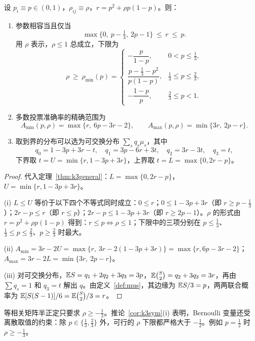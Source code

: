 \documentclass[11pt]{article}
\begin{document}
\begin{corollary}[对称情形]\label{cor:k3sym}
设 $p_i\equiv p\in(0,1)$，$\rho_{ij}\equiv\rho$，$r=p^2+\rho p(1-p)$。则：
\begin{enumerate}[label=(\roman*)]
\item 参数相容当且仅当
\begin{equation}\label{eq:feas}
\max\{0,\ p-\tfrac13,\ 2p-1\}\ \le\ r\ \le\ p .
\end{equation}
用 $\rho$ 表示，$\rho\le1$ 总成立，下限为
\[
\rho\ \ge\ \rho_{\min}(p)=\begin{cases}-\dfrac{p}{1-p}, & 0<p\le\frac13,\\[2mm] \dfrac{p-\frac13-p^2}{p(1-p)}, & \frac13\le p\le\frac23,\\[2mm] -\dfrac{1-p}{p}, & \frac23\le p<1 .\end{cases}
\]
\item 多数投票准确率的精确范围为
\[
\boxed{\ A_{\min}(p,\rho)=\max\{r,\ 6p-3r-2\},\qquad A_{\max}(p,\rho)=\min\{3r,\ 2p-r\}.\ }
\]
\item 取到界的分布可以选为可交换分布 $\sum_s q_s\mu_s$，其中
\[
q_0=1-3p+3r-t,\quad q_1=3p-6r+3t,\quad q_2=3r-3t,\quad q_3=t,
\]
下界取 $t=U=\min\{r,1-3p+3r\}$，上界取 $t=L=\max\{0,2r-p\}$。
\end{enumerate}
\end{corollary}
\begin{proof}
代入定理~\ref{thm:k3general}：$L=\max\{0,2r-p\}$，$U=\min\{r,1-3p+3r\}$。

(i) $L\le U$ 等价于以下四个不等式同时成立：$0\le r$；$0\le1-3p+3r$（即 $r\ge p-\frac13$）；$2r-p\le r$（即 $r\le p$）；$2r-p\le1-3p+3r$（即 $r\ge2p-1$）。$\rho$ 的形式由 $r=p^2+\rho p(1-p)$ 得到：$r\le p\iff\rho\le1$；下限中的三项分别在 $p\le\frac13$、$\frac13\le p\le\frac23$、$p\ge\frac23$ 时最大。

(ii) $A_{\min}=3r-2U=\max\{r,\ 3r-2(1-3p+3r)\}=\max\{r,6p-3r-2\}$；$A_{\max}=3r-2L=\min\{3r,\ 2p-r\}$。

(iii) 对可交换分布，$\mathbb{E} S=q_1+2q_2+3q_3=3p$，$\mathbb{E}\binom S2=q_2+3q_3=3r$，再由 $\sum q_s=1$ 和 $q_3=t$ 解出 $q$。由定义~\ref{def:mus}，其边缘为 $\mathbb{E} S/3=p$，两两联合概率为 $\mathbb{E}[S(S-1)]/6=\mathbb{E}\binom S2/3=r$。
\end{proof}

\begin{remark}
等相关矩阵半正定只要求 $\rho\ge-\frac12$。推论~\ref{cor:k3sym}(i) 表明，Bernoulli 变量还受离散取值的约束：除 $p\in\{\frac13,\frac23\}$ 外，可行的 $\rho$ 下限都严格大于 $-\frac12$。例如 $p=\frac12$ 时 $\rho\ge-\frac13$。
\end{remark}
\end{document}
